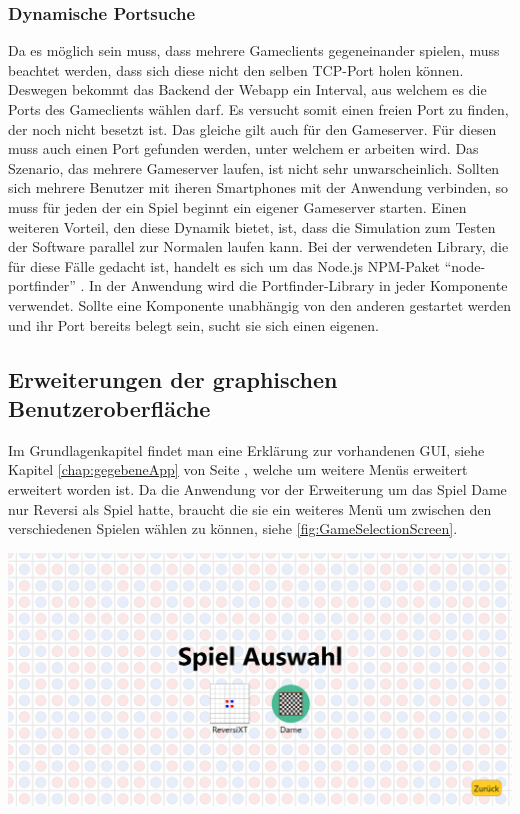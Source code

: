 \documentclass[12pt,a4paper,bibliography=totocnumbered,listof=totocnumbered]{article}
\begin{document}
\subsubsection{Dynamische Portsuche}
Da es möglich sein muss, dass mehrere Gameclients gegeneinander spielen, muss beachtet werden, dass sich diese nicht den selben TCP-Port holen können.
Deswegen bekommt das Backend der Webapp ein Interval, aus welchem es die Ports des Gameclients wählen darf. Es versucht somit einen freien Port zu finden, der noch nicht 
besetzt ist. Das gleiche gilt auch für den Gameserver. Für diesen muss auch einen Port gefunden werden, unter welchem er arbeiten wird. 
Das Szenario, das mehrere Gameserver laufen, ist nicht sehr unwarscheinlich. Sollten sich mehrere Benutzer mit iheren Smartphones mit der Anwendung verbinden,
so muss für jeden der ein Spiel beginnt ein eigener Gameserver starten. Einen weiteren Vorteil, den diese Dynamik bietet, ist, dass die Simulation 
zum Testen der Software parallel zur Normalen laufen kann. Bei der verwendeten Library, die für diese Fälle gedacht ist, handelt es sich um 
das Node.js NPM-Paket ``node-portfinder'' \cite{portfinder}. In der Anwendung wird die Portfinder-Library in jeder Komponente verwendet. Sollte 
eine Komponente unabhängig von den anderen gestartet werden und ihr Port bereits belegt sein, sucht sie sich einen eigenen.

\subsection{ Erweiterungen der graphischen Benutzeroberfläche }
Im Grundlagenkapitel findet man eine Erklärung zur vorhandenen GUI, siehe Kapitel \ref{chap:gegebeneApp} von Seite \pageref{chap:gegebeneApp}, welche 
um weitere Menüs erweitert erweitert worden ist. Da die Anwendung vor der Erweiterung um das Spiel Dame nur Reversi als Spiel hatte, 
braucht die sie ein weiteres Menü um zwischen den verschiedenen Spielen wählen zu können, siehe \ref{fig:GameSelectionScreen}.

\vspace{1em}
\begin{minipage}{\linewidth}
	\centering
	\includegraphics[width=0.7\linewidth]{pics/GameSelectionScreen.png}
	\label{fig:GameSelectionScreen}
\end{minipage}
\end{document}
